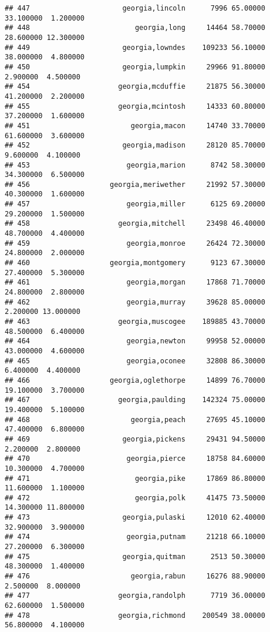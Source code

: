 \documentclass[
]{article}
\begin{document}
\begin{verbatim}
## 447                      georgia,lincoln      7996 65.00000 33.100000  1.200000
## 448                         georgia,long     14464 58.70000 28.600000 12.300000
## 449                      georgia,lowndes    109233 56.10000 38.000000  4.800000
## 450                      georgia,lumpkin     29966 91.80000  2.900000  4.500000
## 454                     georgia,mcduffie     21875 56.30000 41.200000  2.200000
## 455                     georgia,mcintosh     14333 60.80000 37.200000  1.600000
## 451                        georgia,macon     14740 33.70000 61.600000  3.600000
## 452                      georgia,madison     28120 85.70000  9.600000  4.100000
## 453                       georgia,marion      8742 58.30000 34.300000  6.500000
## 456                   georgia,meriwether     21992 57.30000 40.300000  1.600000
## 457                       georgia,miller      6125 69.20000 29.200000  1.500000
## 458                     georgia,mitchell     23498 46.40000 48.700000  4.400000
## 459                       georgia,monroe     26424 72.30000 24.800000  2.000000
## 460                   georgia,montgomery      9123 67.30000 27.400000  5.300000
## 461                       georgia,morgan     17868 71.70000 24.800000  2.800000
## 462                       georgia,murray     39628 85.00000  2.200000 13.000000
## 463                     georgia,muscogee    189885 43.70000 48.500000  6.400000
## 464                       georgia,newton     99958 52.00000 43.000000  4.600000
## 465                       georgia,oconee     32808 86.30000  6.400000  4.400000
## 466                   georgia,oglethorpe     14899 76.70000 19.100000  3.700000
## 467                     georgia,paulding    142324 75.00000 19.400000  5.100000
## 468                        georgia,peach     27695 45.10000 47.400000  6.800000
## 469                      georgia,pickens     29431 94.50000  2.200000  2.800000
## 470                       georgia,pierce     18758 84.60000 10.300000  4.700000
## 471                         georgia,pike     17869 86.80000 11.600000  1.100000
## 472                         georgia,polk     41475 73.50000 14.300000 11.800000
## 473                      georgia,pulaski     12010 62.40000 32.900000  3.900000
## 474                       georgia,putnam     21218 66.10000 27.200000  6.300000
## 475                      georgia,quitman      2513 50.30000 48.300000  1.400000
## 476                        georgia,rabun     16276 88.90000  2.500000  8.000000
## 477                     georgia,randolph      7719 36.00000 62.600000  1.500000
## 478                     georgia,richmond    200549 38.00000 56.800000  4.100000

\end{verbatim}
\end{document}
